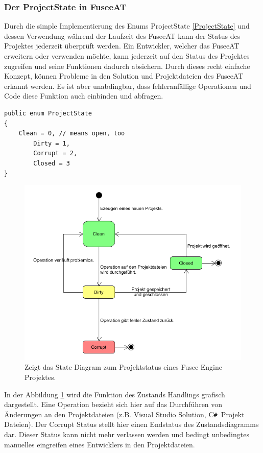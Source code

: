 \documentclass[pagesize, paper=a4, fontsize=12pt, titlepage=true, headings=small, headnosepline, abstractoff, liststotoc, nochapterprefix, plainheadsepline, twoside]{scrreprt}
\newcommand{\CSS}{C\texttt{\# }}
\begin{document}
\subsubsection{Der ProjectState in FuseeAT}
Durch die simple Implementierung des Enums ProjectState \ref{ProjectState} und dessen Verwendung während der Laufzeit des FuseeAT kann der Status des Projektes jederzeit überprüft werden. Ein Entwickler, welcher das FuseeAT erweitern oder verwenden möchte, kann jederzeit auf den Status des Projektes zugreifen und seine Funktionen dadurch absichern. Durch dieses recht einfache Konzept, können Probleme in den Solution und Projektdateien des FuseeAT erkannt werden. Es ist aber unabdingbar, dass fehleranfällige Operationen und Code diese Funktion auch einbinden und abfragen.
\begin{lstlisting}[caption=Code des ProjectState Enums. Wird in FuseeAT verwendet um die Integrität eines Projekts zu repräsentieren., label=ProjectState]
public enum ProjectState
{
	Clean = 0, // means open, too
        Dirty = 1,
        Corrupt = 2,
        Closed = 3
}
\end{lstlisting}

\begin{figure}[ht]
	\centering
	\includegraphics[width=14cm]{Bilder/ProjektStatus.png}
	\caption{Zeigt das State Diagram zum Projektstatus eines Fusee Engine Projektes.}
	\label{FuseeProjektStatus}
\end{figure}

In der Abbildung \ref{FuseeProjektStatus} wird die Funktion des Zustands Handlings grafisch dargestellt. Eine Operation bezieht sich hier auf das Durchführen von Änderungen an den Projektdateien (z.B. Visual Studio Solution, \CSS Projekt Dateien). Der Corrupt Status stellt hier einen Endstatus des Zustandsdiagramms dar. Dieser Status kann nicht mehr verlassen werden und bedingt unbedingtes manuelles eingreifen eines Entwicklers in den Projektdateien.
\end{document}

